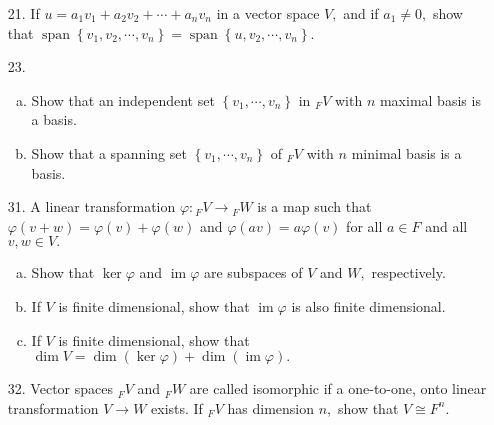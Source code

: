 \documentclass{article}
\DeclareMathOperator{\ima}{im}
\DeclareMathOperator{\spn}{span}
\begin{document}
\begin{itemize}
	\item[21.] If $u=a_1v_1+a_2v_2+\cdots+a_nv_n$ in a vector space $V,$ and if $a_1\neq 0,$ show that $\spn\left\{ v_1, v_2, \cdots, v_n \right\}=\spn\left\{ u, v_2, \cdots, v_n \right\}.$

	\item[23.] \begin{enumerate}[(a)]
			\item Show that an independent set $\left\{ v_1, \cdots, v_n \right\}$ in $_F V$ with $n$ maximal basis is a basis. 

			\item Show that a spanning set $\left\{ v_1, \cdots, v_n \right\}$ of $_F V$ with $n$ minimal basis is a basis.
				
		\end{enumerate}

	\item[31.] A linear transformation $\varphi:{} _F V\to {}_F W$ is a map such that $\varphi(v+w)=\varphi(v)+\varphi(w)$ and $\varphi(av)=a\varphi(v)$ for all $a\in F$ and all $v, w\in V.$ 
		\begin{enumerate}[(a)]
			\item Show that $\ker\varphi$ and $\ima\varphi$ are subspaces of $V$ and $W,$ respectively.

			\item If $V$ is finite dimensional, show that $\ima \varphi$ is also finite dimensional. 

			\item If $V$ is finite dimensional, show that $\dim V=\dim(\ker \varphi)+\dim(\ima \varphi).$ 
		\end{enumerate}

	\item[32.] Vector spaces $_F V$ and $_F W$ are called isomorphic if a one-to-one, onto linear transformation $V\to W$ exists. If $_F V$ has dimension $n,$ show that $V\cong F^n.$
		
\end{itemize}
\end{document}
